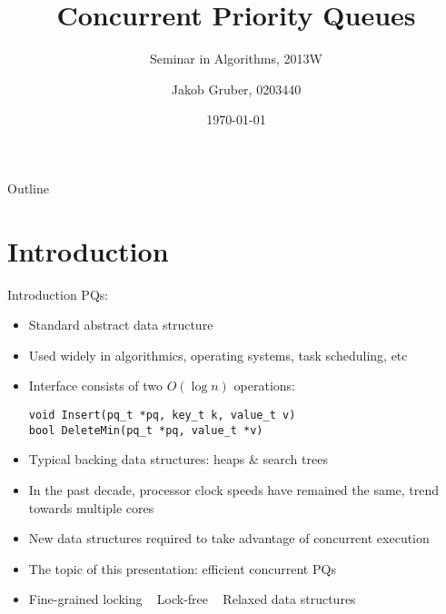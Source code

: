 \documentclass[usenames,dvipsnames]{beamer}
\title{Concurrent Priority Queues}
\subtitle{Seminar in Algorithms, 2013W}
\author{Jakob Gruber, 0203440}
\date{\today}
\begin{document}
\maketitle

\begin{frame}{Outline}
\begin{minipage}[t][10em][t]{\linewidth}
\tableofcontents
\end{minipage}
\end{frame}

\section{Introduction}

\begin{frame}{Introduction}
\acp{PQ}:

\begin{itemize}
\item Standard abstract data structure
\item Used widely in algorithmics, operating systems, task scheduling, etc
\item Interface consists of two $O(\log n)$ operations:

\begin{lstlisting}
void Insert(pq_t *pq, key_t k, value_t v)
bool DeleteMin(pq_t *pq, value_t *v)
\end{lstlisting}

\item Typical backing data structures: heaps \& search trees
\end{itemize}

\framebreak

\begin{itemize}
\item In the past decade, processor clock speeds have remained the same, trend towards multiple cores
\item New data structures required to take advantage of concurrent execution
\item The topic of this presentation: efficient concurrent \acp{PQ}
\item Fine-grained locking \textrightarrow ~ Lock-free \textrightarrow ~ Relaxed data structures
\end{itemize}

\end{frame}
\end{document}
